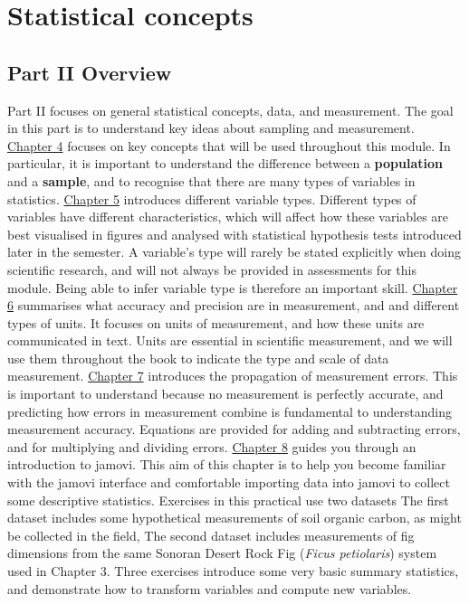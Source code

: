 \documentclass[
]{scrbook}
\begin{document}
\hypertarget{part-statistical-concepts}{%
\part{Statistical concepts}\label{part-statistical-concepts}}

\hypertarget{Week2}{%
\chapter*{Part II Overview}\label{Week2}}

Part II focuses on general statistical concepts, data, and measurement.
The goal in this part is to understand key ideas about sampling and measurement.
\protect\hyperlink{Chapter_4}{Chapter 4} focuses on key concepts that will be used throughout this module.
In particular, it is important to understand the difference between a \textbf{population} and a \textbf{sample}, and to recognise that there are many types of variables in statistics.
\protect\hyperlink{Chapter_5}{Chapter 5} introduces different variable types.
Different types of variables have different characteristics, which will affect how these variables are best visualised in figures and analysed with statistical hypothesis tests introduced later in the semester.
A variable's type will rarely be stated explicitly when doing scientific research, and will not always be provided in assessments for this module.
Being able to infer variable type is therefore an important skill.
\protect\hyperlink{Chapter_6}{Chapter 6} summarises what accuracy and precision are in measurement, and and different types of units.
It focuses on units of measurement, and how these units are communicated in text.
Units are essential in scientific measurement, and we will use them throughout the book to indicate the type and scale of data measurement.
\protect\hyperlink{Chapter_7}{Chapter 7} introduces the propagation of measurement errors.
This is important to understand because no measurement is perfectly accurate, and predicting how errors in measurement combine is fundamental to understanding measurement accuracy.
Equations are provided for adding and subtracting errors, and for multiplying and dividing errors.
\protect\hyperlink{Chapter_8}{Chapter 8} guides you through an introduction to jamovi.
This aim of this chapter is to help you become familiar with the jamovi interface and comfortable importing data into jamovi to collect some descriptive statistics.
Exercises in this practical use two datasets
The first dataset includes some hypothetical measurements of soil organic carbon, as might be collected in the field,
The second dataset includes measurements of fig dimensions from the same Sonoran Desert Rock Fig (\emph{Ficus petiolaris}) system used in Chapter 3.
Three exercises introduce some very basic summary statistics, and demonstrate how to transform variables and compute new variables.
\end{document}
